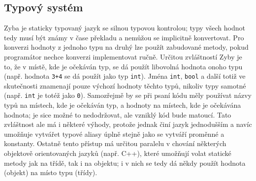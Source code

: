 \documentclass[a4paper,12pt]{article}
\begin{document}
\subsection{Typový systém}
Zyba je staticky typovaný jazyk se silnou typovou kontrolou; typy všech hodnot tedy musí být známy v čase překladu a nemůžou se implicitně konvertovat. Pro konverzi hodnoty z jednoho typu na druhý lze použít zabudované metody, pokud programátor nechce konverzi implementovat ručně. Určitou zvláštností Zyby je to, že v místě, kde je očekáván typ, se dá použít libovolná hodnota onoho typu (např. hodnota \texttt{3+4} se dá použít jako typ \texttt{int}). Jména \texttt{int}, \texttt{bool} a další totiž ve skutečnosti znamenají pouze výchozí hodnoty těchto typů, nikoliv typy samotné (např. \texttt{int} je totéž jako \texttt{0}). Samozřejmě by se při psaní kódu měly používat názvy typů na místech, kde je očekáván typ, a hodnoty na místech, kde je očekávána hodnota; je sice možné to nedodržovat, ale vzniklý kód bude matoucí. Tato zvláštnost ale má i některé výhody, protože jednak činí jazyk jednodušším a navíc umožňuje vytvářet typové aliasy úplně stejně jako se vytváří proměnné a konstanty. Ostatně tento přístup má určitou paralelu v chování některých objektově orientovaných jazyků (např. C++\cite{cpp}), které umožňují volat statické metody jak na třídě, tak i na objektu; i v nich se tedy dá někdy použít hodnota (objekt) na místo typu (třídy).
\end{document}
